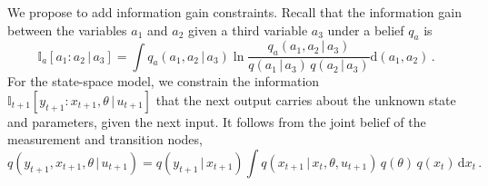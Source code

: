 \documentclass{l4dc2027}
\def\rmd{\mathrm{d}}
\newcommand\given[1][]{\,#1\vert\,}
\begin{document}
We propose to add information gain constraints.
Recall that the information gain between the variables $a_1$ and $a_2$ given a third variable $a_3$ under a belief $q_a$ is~\citep{cover1999elements}
\begin{equation}\label{eq:mutual_info}
	\mathbb{I}_a[a_1 : a_2 \given a_3] = \int q_a(a_1, a_2 \given a_3) \ln \frac{q_a(a_1, a_2 \given a_3)}{q(a_1 \given a_3)\, q(a_2 \given a_3)} \mathrm{d}(a_1,a_2) \, .
\end{equation}
%
For the state-space model, we constrain the information $\mathbb{I}_{t+1}[y_{t+1} : x_{t+1}, \theta \given u_{t+1}]$ that the next output carries about the unknown state and parameters, given the next input. It follows from the joint belief of the measurement and transition nodes,
\begin{equation}\label{eq:joint-belief}
	q(y_{t+1}, x_{t+1}, \theta \given u_{t+1}) = q(y_{t+1} \given x_{t+1}) \int q(x_{t+1} \given x_t, \theta, u_{t+1})\, q(\theta)\, q(x_t)\, \rmd x_t \, .
\end{equation}
\end{document}
